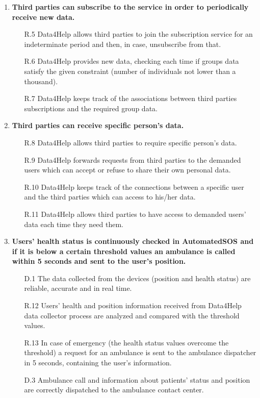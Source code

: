 \documentclass[a4paper]{article}
\begin{document}
\begin{enumerate}[label*=\bf{G.\arabic*}]
        
    \item \textbf{Third parties can subscribe to the service in order to periodically receive new data.}
    
    \begin{enumerate}
        \item [R.5] Data4Help allows third parties to join the subscription service for an indeterminate period and then, in case, unsubscribe from that.
        \item [R.6] Data4Help provides new data, checking each time if groups data satisfy the given constraint (number of individuals not lower than a thousand).
        \item [R.7] Data4Help keeps track of the associations between third parties subscriptions and the required group data.
    \end{enumerate}
    
    
    \item \textbf{Third parties can receive specific person's data.}
            
    \begin{enumerate}
        \item[R.8] Data4Help allows third parties to require specific person's data. 
        \item [R.9] Data4Help forwards requests from third parties to the demanded users which can accept or refuse to share their own personal data.
        \item [R.10] Data4Help keeps track of the connections between a specific user and the third parties which can access to his/her data.
        \item [R.11] Data4Help allows third parties to have access to demanded users' data each time they need them.
    \end{enumerate}
            
        
    \item \textbf{Users' health status is continuously checked in AutomatedSOS and if it is below a certain threshold values an ambulance is called within 5 seconds and sent to the user's position.}

    \begin{enumerate}
        \item [D.1] The data collected from the devices (position and health status) are reliable, accurate and in real time.
        \item [R.12] Users’ health and position information received from Data4Help data collector process are analyzed and compared with the threshold values.
        \item [R.13] In case of emergency (the health status values overcome the threshold) a request for an ambulance is sent to the ambulance dispatcher in 5 seconds, containing the user's information.
        \item [D.3] Ambulance call and information about patients' status and position are correctly dispatched to the ambulance contact center.
    \end{enumerate}
    

\end{enumerate}
\end{document}
